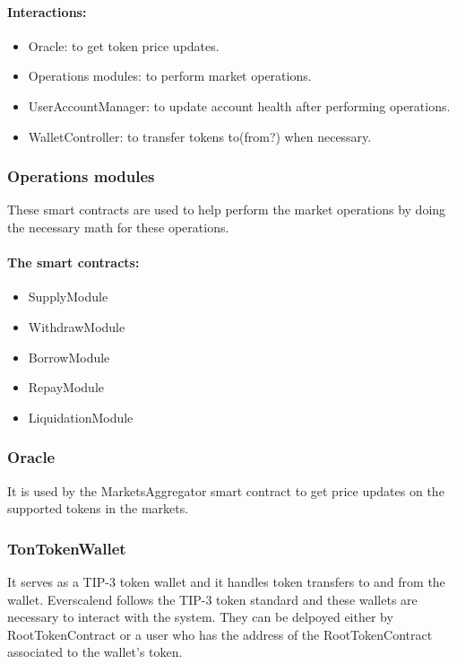 \paragraph*{Interactions:}
\begin{itemize}
  \item Oracle: to get token price updates.
  \item Operations modules: to perform market operations.
  \item UserAccountManager: to update account health after performing operations.
  \item WalletController: to transfer tokens to(from?) when necessary.
\end{itemize}

\subsubsection{Operations modules}

These smart contracts are used to help perform the market operations by doing the necessary math for these operations.

\paragraph*{The smart contracts:}
\begin{itemize}
  \item SupplyModule
  \item WithdrawModule
  \item BorrowModule
  \item RepayModule
  \item LiquidationModule
\end{itemize}

\subsubsection{Oracle}

It is used by the MarketsAggregator smart contract to get price updates on the supported tokens in the markets.

\subsubsection{TonTokenWallet}

It serves as a TIP-3 token wallet and it handles token transfers to and from the wallet. Everscalend follows the TIP-3 token standard and these wallets are necessary to interact with the system. They can be delpoyed either by RootTokenContract or a user who has the address of the RootTokenContract associated to the wallet's token.

